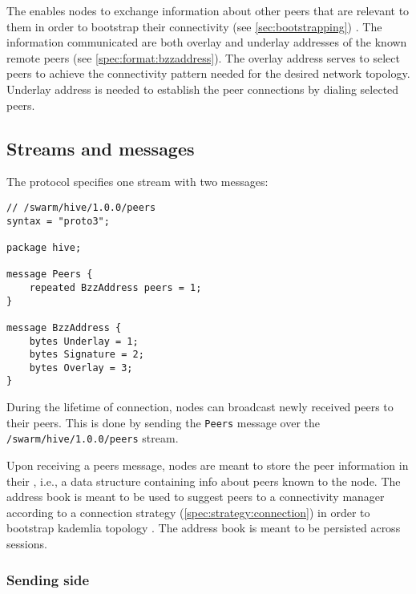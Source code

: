 The  enables nodes to exchange information about other peers that are relevant to them in order to bootstrap their connectivity  (see \ref{sec:bootstrapping}) . The information communicated are both overlay and underlay addresses of the known remote peers (see  \ref{spec:format:bzzaddress}). The overlay address serves to select peers to achieve the connectivity pattern needed for the desired network topology. Underlay address is needed to establish the peer connections by dialing selected peers.

\subsection{Streams and messages \statusgreen}


The protocol specifies one stream with two messages:

\begin{definition}\label{def:hive-messages}

\begin{lstlisting}
// /swarm/hive/1.0.0/peers
syntax = "proto3";

package hive;

message Peers {
    repeated BzzAddress peers = 1;
}

message BzzAddress {
    bytes Underlay = 1;
    bytes Signature = 2;
    bytes Overlay = 3;
}

\end{lstlisting}
\end{definition}

During the lifetime of connection, nodes can broadcast newly received peers to their peers. This is done by sending the \lstinline{Peers} message over the \\\lstinline{/swarm/hive/1.0.0/peers} stream.

Upon receiving a peers message, nodes are meant to store the peer information in their , i.e., a data structure containing info about peers known to the node. The address book is meant to be used to suggest peers  to a connectivity manager according to a connection strategy (\ref{spec:strategy:connection}) in order to bootstrap kademlia topology%
. The address book is meant to be persisted across sessions.

\subsubsection{Sending side}

